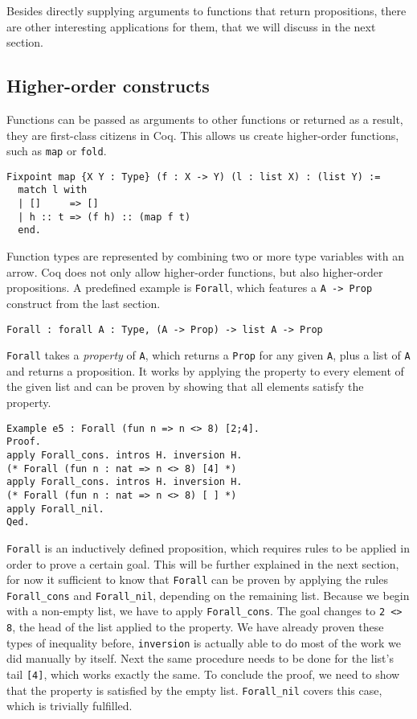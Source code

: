 \documentclass{scrreprt}
\newcommand{\todo}[1]{\marginpar{\textbf{TODO:} #1}}
\newcommand{\coqinline}[1]{\texttt{#1}}
\begin{document}
Besides directly supplying arguments to functions that return propositions, there are other interesting applications for them, that we will discuss in the next section.

\subsection{Higher-order constructs}
Functions can be passed as arguments to other functions or returned as a result, they are first-class citizens in Coq. This allows us create higher-order functions, such as \coqinline{map} or \coqinline{fold}.
\todo{minted bug?}
\begin{verbatim}
Fixpoint map {X Y : Type} (f : X -> Y) (l : list X) : (list Y) :=
  match l with
  | []     => []
  | h :: t => (f h) :: (map f t)
  end.
\end{verbatim}
Function types are represented by combining two or more type variables with an arrow. Coq does not only allow higher-order functions, but also higher-order propositions. A predefined example is \coqinline{Forall}, which features a \coqinline{A -> Prop} construct from the last section.
\begin{verbatim}
Forall : forall A : Type, (A -> Prop) -> list A -> Prop
\end{verbatim}
\coqinline{Forall} takes a \textit{property} of \coqinline{A}, which returns a \coqinline{Prop} for any given \coqinline{A}, plus a list of \coqinline{A} and returns a proposition. It works by applying the property to every element of the given list and can be proven by showing that all elements satisfy the property.
\begin{verbatim}
Example e5 : Forall (fun n => n <> 8) [2;4].
Proof.
apply Forall_cons. intros H. inversion H.
(* Forall (fun n : nat => n <> 8) [4] *)
apply Forall_cons. intros H. inversion H.
(* Forall (fun n : nat => n <> 8) [ ] *)
apply Forall_nil.
Qed.
\end{verbatim}
\coqinline{Forall} is an inductively defined proposition, which requires rules to be applied in order to prove a certain goal. This will be further explained in the next section, for now it sufficient to know that \coqinline{Forall} can be proven by applying the rules \coqinline{Forall_cons} and \coqinline{Forall_nil}, depending on the remaining list. Because we begin with a non-empty list, we have to apply \coqinline{Forall_cons}. The goal changes to \coqinline{2 <> 8}, the head of the list applied to the property. We have already proven these types of inequality before, \coqinline{inversion} is actually able to do most of the work we did manually by itself. Next the same procedure needs to be done for the list's tail \coqinline{[4]}, which works exactly the same. To conclude the proof, we need to show that the property is satisfied by the empty list. \coqinline{Forall_nil} covers this case, which is trivially fulfilled.
\end{document}
